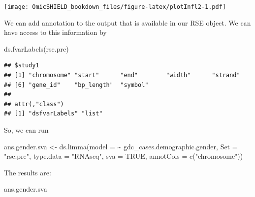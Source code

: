 \documentclass[
]{book}
\newenvironment{Shaded}{\begin{snugshade}}{\end{snugshade}}
\newcommand{\AttributeTok}[1]{\textcolor[rgb]{0.77,0.63,0.00}{#1}}
\newcommand{\ConstantTok}[1]{\textcolor[rgb]{0.00,0.00,0.00}{#1}}
\newcommand{\FunctionTok}[1]{\textcolor[rgb]{0.00,0.00,0.00}{#1}}
\newcommand{\NormalTok}[1]{#1}
\newcommand{\OtherTok}[1]{\textcolor[rgb]{0.56,0.35,0.01}{#1}}
\newcommand{\SpecialCharTok}[1]{\textcolor[rgb]{0.00,0.00,0.00}{#1}}
\newcommand{\StringTok}[1]{\textcolor[rgb]{0.31,0.60,0.02}{#1}}
\begin{document}
\texttt{[image: OmicSHIELD\_bookdown\_files/figure-latex/plotInfl2-1.pdf]}

We can add annotation to the output that is available in our RSE object. We can have access to this information by

\begin{Shaded}
\begin{Highlighting}[]
\FunctionTok{ds.fvarLabels}\NormalTok{(}\StringTok{\textquotesingle{}rse.pre\textquotesingle{}}\NormalTok{)}
\end{Highlighting}
\end{Shaded}

\begin{verbatim}
## $study1
## [1] "chromosome" "start"      "end"        "width"      "strand"    
## [6] "gene_id"    "bp_length"  "symbol"    
## 
## attr(,"class")
## [1] "dsfvarLabels" "list"
\end{verbatim}

So, we can run

\begin{Shaded}
\begin{Highlighting}[]
\NormalTok{ans.gender.sva }\OtherTok{\textless{}{-}} \FunctionTok{ds.limma}\NormalTok{(}\AttributeTok{model =}  \SpecialCharTok{\textasciitilde{}}\NormalTok{ gdc\_cases.demographic.gender, }
                       \AttributeTok{Set =} \StringTok{"rse.pre"}\NormalTok{, }\AttributeTok{type.data =} \StringTok{"RNAseq"}\NormalTok{,}
                       \AttributeTok{sva =} \ConstantTok{TRUE}\NormalTok{, }\AttributeTok{annotCols =} \FunctionTok{c}\NormalTok{(}\StringTok{"chromosome"}\NormalTok{))}
\end{Highlighting}
\end{Shaded}

The results are:

\begin{Shaded}
\begin{Highlighting}[]
\NormalTok{ans.gender.sva}
\end{Highlighting}
\end{Shaded}
\end{document}

